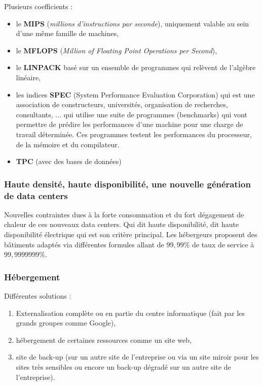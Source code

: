 \documentclass[10pt,a4paper,oneside,titlepage]{report}
\begin{document}
Plusieurs coefficients : \begin{itemize}
\item le \textbf{MIPS} (\textit{millions d'instructions par seconde}),
uniquement valable au sein d'une m\^eme famille de machines,
\item le \textbf{MFLOPS} (\textit{Million of Floating Point Operations per
Second}),
\item le \textbf{LINPACK} basé sur un ensemble de programmes qui relèvent de
l'algèbre linéaire,
\item les indices \textbf{SPEC} (System Performance Evaluation Corporation) qui
est une association de constructeurs, universités, organisation de recherches,
consultants, ... qui utilise une suite de programmes (benchmarks) qui vont
permettre de prédire les performances d'une machine pour une charge de travail
déterminée. Ces programmes testent les performances du processeur, de la mémoire
et du compilateur.
\item \textbf{TPC} (avec des bases de données)
\end{itemize}

\subsubsection{Haute densité, haute disponibilité, une nouvelle génération de
data centers}

Nouvelles contraintes dues à la forte consommation et du fort dégagement de
chaleur de ces nouveaux data centers. Qui dit haute disponibilité, dit haute
disponibilité électrique qui est son critère principal. Les hébergeurs proposent
des bâtiments adaptés via différentes formules allant de $99,99 \%$ de taux de
service à $99,9999999 \%$.

\subsubsection{Hébergement}

Différentes solutions :
\begin{enumerate}
\item Externalisation complète ou en partie du centre informatique (fait par
les grands groupes comme Google),
\item hébergement de certaines ressources comme un site web,
\item site de back-up (sur un autre site de l'entreprise ou via un site miroir
pour les sites très sensibles ou encore un back-up dégradé sur un autre site de
l'entreprise).
\end{enumerate}
\end{document}
